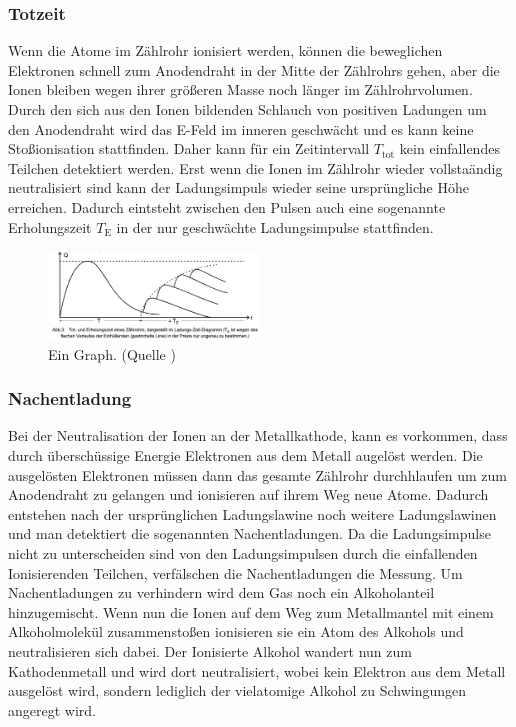 \subsubsection{Totzeit}
Wenn die Atome im Zählrohr ionisiert werden, können die beweglichen Elektronen schnell zum Anodendraht in der Mitte der Zählrohrs gehen, aber die Ionen bleiben wegen ihrer größeren Masse noch länger im Zählrohrvolumen.
Durch den sich aus den Ionen bildenden Schlauch von positiven Ladungen um den Anodendraht wird das E-Feld im inneren geschwächt und es kann keine Stoßionisation stattfinden.
Daher kann für ein Zeitintervall $T_{\text{tot}}$ kein einfallendes Teilchen detektiert werden.
Erst wenn die Ionen im Zählrohr wieder vollstaändig neutralisiert sind kann der Ladungsimpuls wieder seine ursprüngliche Höhe erreichen.
Dadurch eintsteht zwischen den Pulsen auch eine sogenannte Erholungszeit $T_{\text{E}}$ in der nur geschwächte Ladungsimpulse stattfinden.
\begin{figure}
    \centering
    \includegraphics[width=0.5\textwidth]{bilder/Totzeit_Erholungszeit.png}
    \caption{Ein Graph. (Quelle \cite{Anleitung})}
    \label{fig:Totzeit_Erholungszeit}
\end{figure}
\subsubsection{Nachentladung}
\label{sec:Nachentladung}
Bei der Neutralisation der Ionen an der Metallkathode, kann es vorkommen, dass durch überschüssige Energie Elektronen aus dem Metall augelöst werden.
Die ausgelösten Elektronen müssen dann das gesamte Zählrohr durchhlaufen um zum Anodendraht zu gelangen und ionisieren auf ihrem Weg neue Atome.
Dadurch entstehen nach der ursprünglichen Ladungslawine noch weitere Ladungslawinen und man detektiert die sogenannten Nachentladungen.
Da die Ladungsimpulse nicht zu unterscheiden sind von den Ladungsimpulsen durch die einfallenden Ionisierenden Teilchen, verfälschen die Nachentladungen die Messung.
Um Nachentladungen zu verhindern wird dem Gas noch ein Alkoholanteil hinzugemischt.
Wenn nun die Ionen auf dem Weg zum Metallmantel mit einem Alkoholmolekül zusammenstoßen ionisieren sie ein Atom des Alkohols und neutralisieren sich dabei.
Der Ionisierte Alkohol wandert nun zum Kathodenmetall und wird dort neutralisiert, wobei kein Elektron aus dem Metall ausgelöst wird, sondern lediglich der vielatomige Alkohol zu Schwingungen angeregt wird.
